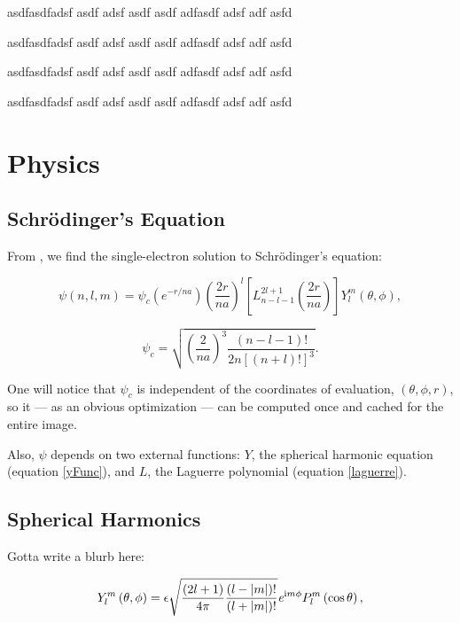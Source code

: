 \documentclass{acmsiggraph}
\begin{document}
asdfasdfadsf asdf adsf asdf asdf adfasdf adsf adf asfd

asdfasdfadsf asdf adsf asdf asdf adfasdf adsf adf asfd

asdfasdfadsf asdf adsf asdf asdf adfasdf adsf adf asfd

asdfasdfadsf asdf adsf asdf asdf adfasdf adsf adf asfd

\section{Physics}

\subsection{Schr\"{o}dinger's Equation}

From \cite{quantumBook}, we find the single-electron solution to Schr\"{o}dinger's equation:

\begin{equation}\label{psi}
\psi\left(n, l, m\right)=\psi_c
\left(\mathit{e}^{-r/na}\right)
\left(\frac{2r}{na}\right)^l
\left[L_{n-l-1}^{2l+1}
    \left(\frac{2r}{na}\right)\right]
Y_l^m\left(\theta,\phi\right),
\end{equation}

\begin{equation}\label{psiConstant}
\psi_c=\sqrt{\left(\frac{2}{na}\right)^3
    \frac{\left(n-l-1\right)!}{2n\left[\left(n+l\right)!\right]^3}}.
\end{equation}

One will notice that $\psi_c$ is independent of the coordinates of evaluation, $\left(\theta, \phi, r\right)$, so it --- as an obvious optimization --- can be computed once and cached for the entire image.

Also, $\psi$ depends on two external functions: $Y$, the spherical harmonic equation (equation \ref{yFunc}), and $L$, the Laguerre polynomial (equation \ref{laguerre}).

\subsection{Spherical Harmonics\label{sphericalHarmonics}}

Gotta write a blurb here:

\begin{equation}\label{yFunc}
Y_l^m\left(\theta,\phi\right)=\epsilon
\sqrt{\frac{\left(2l+1\right)}{4\pi}
    \frac{\left(l-\left|m\right|\right)!}{\left(l+\left|m\right|\right)!}}
\mathit{e}^{{\rm i}m\phi}
P^m_l\left(\cos\theta\right),
\end{equation}
\end{document}

